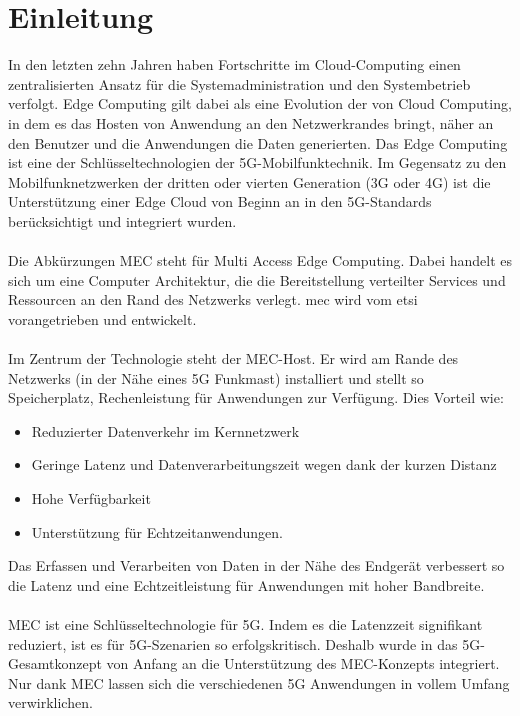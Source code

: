 \documentclass[runningheads]{llncs}
\numberwithin{figure}{section}
\begin{document}
\section{Einleitung}
\label{sec:Einleitung}
In den letzten zehn Jahren haben Fortschritte im Cloud-Computing einen zentralisierten Ansatz für die Systemadministration und den 
Systembetrieb verfolgt. Edge Computing gilt dabei als eine Evolution der von Cloud Computing, in dem es das Hosten von Anwendung an den
Netzwerkrandes bringt, näher an den Benutzer und die Anwendungen die Daten generierten. 
Das Edge Computing ist eine der Schlüsseltechnologien der 5G-Mobilfunktechnik. 
Im Gegensatz zu den Mobilfunknetzwerken der dritten oder vierten Generation (3G oder 4G) ist die Unterstützung einer Edge Cloud 
von Beginn an in den 5G-Standards berücksichtigt und integriert wurden.
\\
\\
Die Abkürzungen MEC steht für Multi Access Edge Computing. Dabei handelt es sich um eine Computer Architektur,
die die Bereitstellung verteilter Services und Ressourcen an den Rand des Netzwerks verlegt. \acrshort{mec} wird vom
\acrfull{etsi} vorangetrieben und entwickelt. 
\\
\\
Im Zentrum der Technologie steht der MEC-Host. 
Er wird am Rande des Netzwerks (in der Nähe eines 5G Funkmast) installiert und stellt so Speicherplatz, 
Rechenleistung für Anwendungen zur Verfügung. Dies Vorteil wie:
\begin{itemize}
  \item Reduzierter Datenverkehr im Kernnetzwerk
  \item Geringe Latenz und Datenverarbeitungszeit wegen dank der kurzen Distanz
  \item Hohe Verfügbarkeit
  \item Unterstützung für Echtzeitanwendungen.
\end{itemize}
Das Erfassen und Verarbeiten von Daten in der Nähe des Endgerät verbessert so 
die Latenz und eine Echtzeitleistung für Anwendungen mit hoher Bandbreite.
\\
\\
MEC ist eine Schlüsseltechnologie für 5G. 
Indem es die Latenzzeit signifikant reduziert, ist es für 5G-Szenarien so erfolgskritisch. 
Deshalb wurde in das 5G-Gesamtkonzept von Anfang an die Unterstützung des MEC-Konzepts integriert. 
Nur dank MEC lassen sich die verschiedenen 5G Anwendungen in vollem Umfang verwirklichen.
\\
\\
\end{document}
